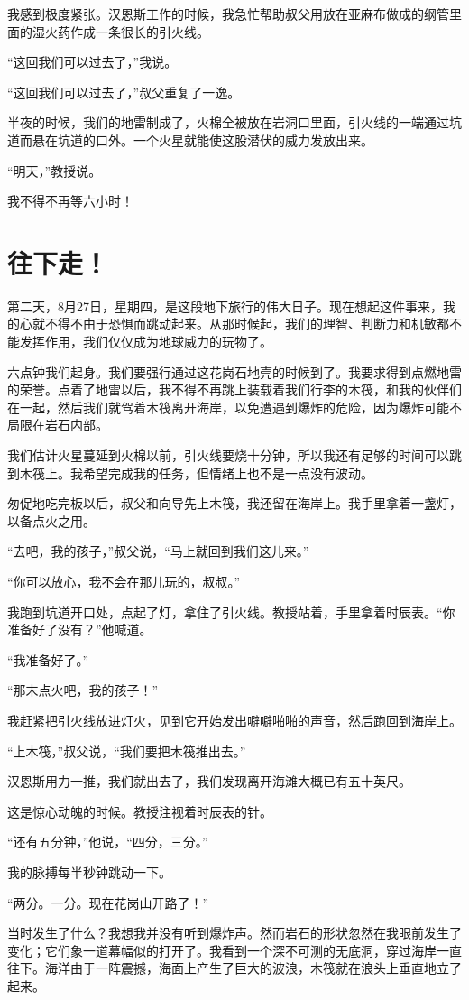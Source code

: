 \documentclass[10pt]{book}
\begin{document}
我感到极度紧张。汉恩斯工作的时候，我急忙帮助叔父用放在亚麻布做成的纲管里面的湿火药作成一条很长的引火线。

“这回我们可以过去了，”我说。

“这回我们可以过去了，”叔父重复了一逸。

半夜的时候，我们的地雷制成了，火棉全被放在岩洞口里面，引火线的一端通过坑道而悬在坑道的口外。一个火星就能使这股潜伏的威力发放出来。

“明天，”教授说。

我不得不再等六小时！
\chapter{往下走！}
第二天，8月27日，星期四，是这段地下旅行的伟大日子。现在想起这件事来，我的心就不得不由于恐惧而跳动起来。从那时候起，我们的理智、判断力和机敏都不能发挥作用，我们仅仅成为地球威力的玩物了。

六点钟我们起身。我们要强行通过这花岗石地壳的时候到了。我要求得到点燃地雷的荣誉。点着了地雷以后，我不得不再跳上装载着我们行李的木筏，和我的伙伴们在一起，然后我们就驾着木筏离开海岸，以免遭遇到爆炸的危险，因为爆炸可能不局限在岩石内部。

我们估计火星蔓延到火棉以前，引火线要烧十分钟，所以我还有足够的时间可以跳到木筏上。我希望完成我的任务，但情绪上也不是一点没有波动。

匆促地吃完板以后，叔父和向导先上木筏，我还留在海岸上。我手里拿着一盏灯，以备点火之用。

“去吧，我的孩子，”叔父说，“马上就回到我们这儿来。”

“你可以放心，我不会在那儿玩的，叔叔。”

我跑到坑道开口处，点起了灯，拿住了引火线。教授站着，手里拿着时辰表。“你准备好了没有？”他喊道。

“我准备好了。”

“那末点火吧，我的孩子！”

我赶紧把引火线放进灯火，见到它开始发出噼噼啪啪的声音，然后跑回到海岸上。

“上木筏，”叔父说，“我们要把木筏推出去。”

汉恩斯用力一推，我们就出去了，我们发现离开海滩大概已有五十英尺。

这是惊心动魄的时候。教授注视着时辰表的针。

“还有五分钟，”他说，“四分，三分。”

我的脉搏每半秒钟跳动一下。

“两分。一分。现在花岗山开路了！”

当时发生了什么？我想我并没有听到爆炸声。然而岩石的形状忽然在我眼前发生了变化；它们象一道幕幅似的打开了。我看到一个深不可测的无底洞，穿过海岸一直往下。海洋由于一阵震撼，海面上产生了巨大的波浪，木筏就在浪头上垂直地立了起来。
\end{document}
